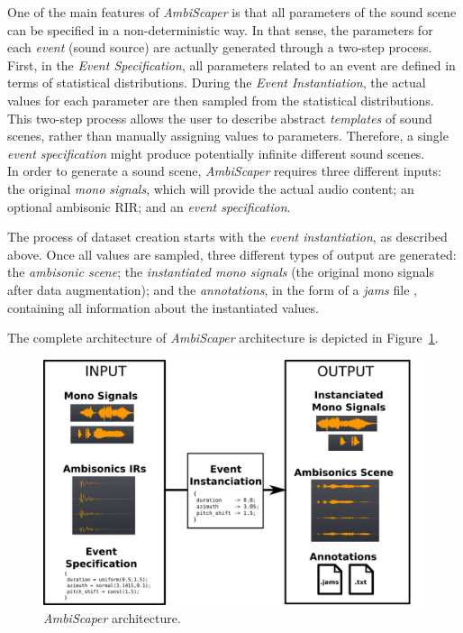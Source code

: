 One of the main features of \textit{AmbiScaper} is that all parameters of the sound scene can be specified in a non-deterministic way. In that sense, the parameters for each \textit{event} (sound source) are actually generated through a two-step process. First, in the \textit{Event Specification}, all parameters related to an event are defined in terms of statistical distributions. During the \textit{Event Instantiation}, the actual values for each parameter are then sampled from the statistical distributions.
This two-step process allows the user to describe abstract \textit{templates} of sound scenes, rather than manually assigning values to parameters. Therefore, a single \textit{event specification} might produce potentially infinite different sound scenes. \\


In order to generate a sound scene, \textit{AmbiScaper} requires three different inputs: the original \textit{mono signals}, which will provide the actual audio content; an optional ambisonic RIR; and an \textit{event specification}. 

The process of dataset creation starts with the \textit{event instantiation}, as described above. Once all values are sampled, three different types of output are generated: the \textit{ambisonic scene}; the \textit{instantiated mono signals} (the original mono signals after data augmentation); and the \textit{annotations}, in the form of a \textit{jams} file \cite{humphrey2014jams}, containing all information about the instantiated values. 

The complete architecture of \textit{AmbiScaper} architecture is depicted in Figure~\ref{fig:architecture}.\\


\begin{figure}
  \centering
	\includegraphics[width=\textwidth]{Figures/DataGeneration/figure_architecture_V2.png}
    \caption{\textit{AmbiScaper} architecture.}
	\label{fig:architecture}
\end{figure}



